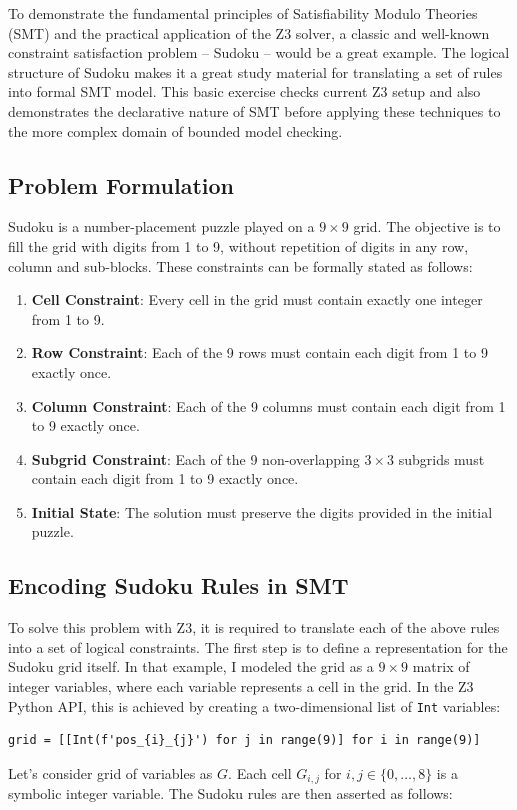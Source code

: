 \documentclass[12pt, a4paper, oneside]{report} %
\begin{document}
To demonstrate the fundamental principles of Satisfiability Modulo Theories (SMT) and the practical application of the Z3 solver, a classic and well-known constraint satisfaction problem -- Sudoku -- would be a great example. The logical structure of Sudoku makes it a great study material for translating a set of rules into formal SMT model. This basic exercise checks current Z3 setup and also demonstrates the declarative nature of SMT before applying these techniques to the more complex domain of bounded model checking.
\subsection{Problem Formulation}
Sudoku is a number-placement puzzle played on a $9 \times 9$ grid. The objective is to fill the grid with digits from 1 to 9, without repetition of digits in any row, column and sub-blocks. These constraints can be formally stated as follows:
\begin{enumerate}
    \item \textbf{Cell Constraint}: Every cell in the grid must contain exactly one integer from 1 to 9.
    \item \textbf{Row Constraint}: Each of the 9 rows must contain each digit from 1 to 9 exactly once.
    \item \textbf{Column Constraint}: Each of the 9 columns must contain each digit from 1 to 9 exactly once.
    \item \textbf{Subgrid Constraint}: Each of the 9 non-overlapping $3 \times 3$ subgrids must contain each digit from 1 to 9 exactly once.
    \item \textbf{Initial State}: The solution must preserve the digits provided in the initial puzzle.
\end{enumerate}

\subsection{Encoding Sudoku Rules in SMT}
To solve this problem with Z3, it is required to translate each of the above rules into a set of logical constraints. The first step is to define a representation for the Sudoku grid itself. In that example, I modeled the grid as a $9 \times 9$ matrix of integer variables, where each variable represents a cell in the grid. In the Z3 Python API, this is achieved by creating a two-dimensional list of \texttt{Int} variables:
\begin{verbatim}
grid = [[Int(f'pos_{i}_{j}') for j in range(9)] for i in range(9)]
\end{verbatim}
Let's consider grid of variables as $G$. Each cell $G_{i,j}$ for $i, j \in \{0, \dots, 8\}$ is a symbolic integer variable. The Sudoku rules are then asserted as follows:
\end{document}
